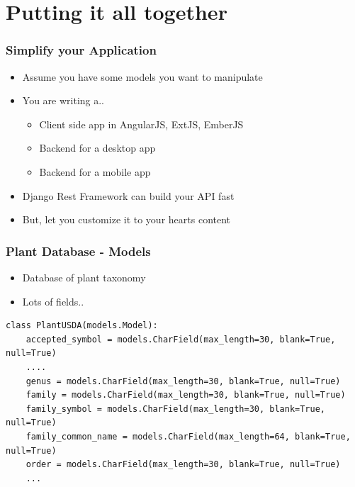 \documentclass{beamer}
\begin{document}
\section{Putting it all together}
\begin{frame}[fragile]

  \frametitle{Simplify your Application}
  
  \begin{itemize}
      \item Assume you have some models you want to manipulate
      \item You are writing a..
            \begin{itemize}
                \item Client side app in AngularJS, ExtJS, EmberJS
                \item Backend for a desktop app
                \item Backend for a mobile app
            \end{itemize}
      \item Django Rest Framework can build your API fast
      \item But, let you customize it to your hearts content
  \end{itemize}
  
\end{frame}

\begin{frame}[fragile]

  \frametitle{Plant Database - Models}
  
  \begin{itemize}
      \item Database of plant taxonomy
      \item Lots of fields..
  \end{itemize}
  
  \begin{lstlisting}
class PlantUSDA(models.Model):
    accepted_symbol = models.CharField(max_length=30, blank=True, null=True)
    ....
    genus = models.CharField(max_length=30, blank=True, null=True)
    family = models.CharField(max_length=30, blank=True, null=True)
    family_symbol = models.CharField(max_length=30, blank=True, null=True)
    family_common_name = models.CharField(max_length=64, blank=True, null=True)
    order = models.CharField(max_length=30, blank=True, null=True)
    ...
  \end{lstlisting}
  
\end{frame}
\end{document}
